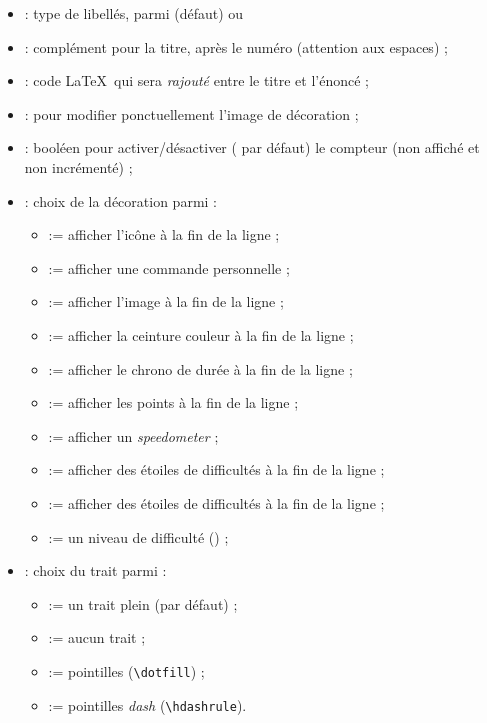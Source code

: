\documentclass[french,11pt,a4paper]{article}
\begin{document}
\begin{itemize}
	\item {} : type de libellés, parmi  (défaut) ou 
	\item {} : complément pour la titre, après le numéro (attention aux espaces) ;
	\item {} : code \LaTeX\ qui sera \textit{rajouté} entre le titre et l'énoncé ;
	\item {} : pour modifier ponctuellement l'image de décoration ;
	\item {} : booléen pour activer/désactiver ( par défaut) le compteur (non affiché et non incrémenté) ;
	\item {} : choix de la décoration parmi :
	\begin{itemize}
		\item {} := afficher l'icône  à la fin de la ligne ;
		\item {} := afficher une commande personnelle ;
		\item {} := afficher l'image  à la fin de la ligne ;
		\item {} := afficher la ceinture couleur  à la fin de la ligne ;
		\item {} := afficher le chrono de durée  à la fin de la ligne ;
		\item {} := afficher les points  à la fin de la ligne ;
		\item {} := afficher un \textit{speedometer} ;
		\item {} := afficher des étoiles de difficultés à la fin de la ligne ;
		\item {} := afficher des étoiles de difficultés à la fin de la ligne ;
		\item {} := un niveau de difficulté ()  ;
	\end{itemize}
	\item {} : choix du trait parmi :
	\begin{itemize}
		\item {} := un trait plein (par défaut) ;
		\item {} := aucun trait ;
		\item {} := pointilles (\texttt{\textbackslash dotfill}) ;
		\item {} := pointilles \textit{dash} (\texttt{\textbackslash hdashrule}).
	\end{itemize}
\end{itemize}
\end{document}

